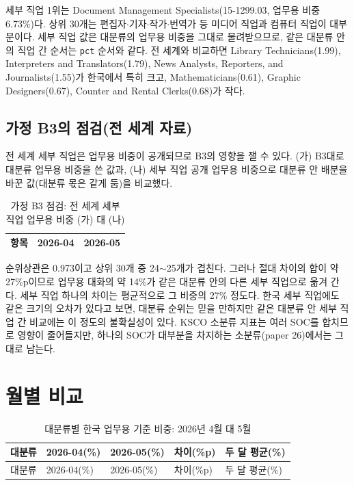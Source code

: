 \documentclass[11pt]{article}
\begin{document}
세부 직업 1위는 Document Management Specialists(15-1299.03, 업무용 비중 6.73\%)다. 상위 30개는 편집자$\cdot$기자$\cdot$작가$\cdot$번역가 등 미디어 직업과 컴퓨터 직업이 대부분이다. 세부 직업 값은 대분류의 업무용 비중을 그대로 물려받으므로, 같은 대분류 안의 직업 간 순서는 \texttt{pct} 순서와 같다. 전 세계와 비교하면 Library Technicians(1.99), Interpreters and Translators(1.79), News Analysts, Reporters, and Journalists(1.55)가 한국에서 특히 크고, Mathematicians(0.61), Graphic Designers(0.67), Counter and Rental Clerks(0.68)가 작다.

\subsection{가정 B3의 점검(전 세계 자료)}

전 세계 세부 직업은 업무용 비중이 공개되므로 B3의 영향을 잴 수 있다. (가) B3대로 대분류 업무용 비중을 쓴 값과, (나) 세부 직업 공개 업무용 비중으로 대분류 안 배분을 바꾼 값(대분류 몫은 같게 둠)을 비교했다.

\begin{longtable}{L{9.5cm}R{2.2cm}R{2.2cm}}
\caption{가정 B3 점검: 전 세계 세부 직업 업무용 비중 (가) 대 (나)}\label{tab:b3}\\
\toprule
항목 & 2026-04 & 2026-05 \\
\midrule

\bottomrule
\end{longtable}

순위상관은 0.973이고 상위 30개 중 24$\sim$25개가 겹친다. 그러나 절대 차이의 합이 약 27\%p이므로 업무용 대화의 약 14\%가 같은 대분류 안의 다른 세부 직업으로 옮겨 간다. 세부 직업 하나의 차이는 평균적으로 그 비중의 27\% 정도다. 한국 세부 직업에도 같은 크기의 오차가 있다고 보면, 대분류 순위는 믿을 만하지만 같은 대분류 안 세부 직업 간 비교에는 이 정도의 불확실성이 있다. KSCO 소분류 지표는 여러 SOC를 합치므로 영향이 줄어들지만, 하나의 SOC가 대부분을 차지하는 소분류(paper 26)에서는 그대로 남는다.

\section{월별 비교}

\begin{longtable}{L{6.2cm}R{2.0cm}R{2.0cm}R{1.8cm}R{2.2cm}}
\caption{대분류별 한국 업무용 기준 비중: 2026년 4월 대 5월}\label{tab:months}\\
\toprule
대분류 & 2026-04(\%) & 2026-05(\%) & 차이(\%p) & 두 달 평균(\%) \\
\midrule
\endfirsthead
\toprule
대분류 & 2026-04(\%) & 2026-05(\%) & 차이(\%p) & 두 달 평균(\%) \\
\midrule
\endhead

\bottomrule
\end{longtable}
\end{document}
